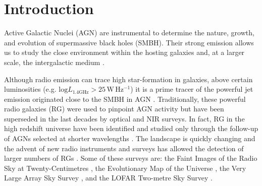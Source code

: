 \documentclass{aa}
\begin{document}

   \maketitle
%

\section{Introduction}\label{sec:introduction}

Active Galactic Nuclei (AGN) are instrumental to determine the nature, growth, and evolution of supermassive black holes (SMBH). Their strong emission allows us to study the close environment within the hosting galaxies and, at a larger scale,  the intergalactic medium \citep{2017A&ARv..25....2P}.

Although radio emission can trace high star-formation in galaxies, above certain luminosities (e.g. $\mathrm{log}L_{1.4\mathrm{GHz}} {>} 25\,\mathrm{W\, Hz^{-1}}$) it is a prime tracer of the powerful jet emission originated  close to the SMBH in AGN \citep[Radio Galaxies,][]{2014ARA&A..52..589H}. Traditionally, these powerful radio galaxies (RG) were used to pinpoint AGN activity but have been superseded in the last decades by optical and NIR surveys. In fact, RG in the high redshift universe have been identified and studied only through the follow-up of AGNs selected at shorter wavelengths \citep[optical, NIR, millimetre, and X-rays, e.g.][]{2006ApJ...652..157M, 2020A&A...637A..84P, 2021MNRAS.501.3833D}.
The landscape is quickly changing and the advent of new radio instruments and surveys has allowed the detection of larger numbers of RGs \citep[e.g.][]{2018MNRAS.475.3429W, 2020A&A...642A.107C}. Some of these surveys are: the Faint Images of the Radio Sky at Twenty-Centimetres \citep[FIRST;][]{2015ApJ...801...26H}, the Evolutionary Map of the Universe \citep[EMU;][]{2011PASA...28..215N}, the Very Large Array Sky Survey \citep[VLASS;][]{2020RNAAS...4..175G}, and the LOFAR Two-metre Sky Survey \citep[LoTSS][]{2019A&A...622A...1S}. 
\end{document}
